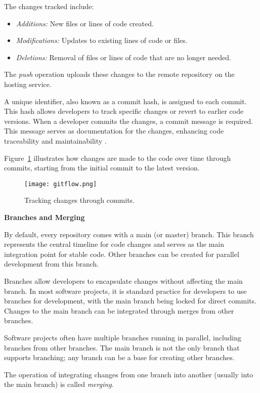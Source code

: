 The changes tracked include:

\begin{itemize}
\item \textit{Additions:} New files or lines of code created.
\item \textit{Modifications:} Updates to existing lines of code or files.
\item \textit{Deletions:} Removal of files or lines of code that are no longer needed.
\end{itemize}

The \textit{push} operation uploads these changes to the remote repository on the hosting service.

A unique identifier, also known as a commit hash, is assigned to each commit. This hash allows developers to track specific changes or revert to earlier code versions. When a developer commits the changes, a commit message is required. This message serves as documentation for the changes, enhancing code traceability and maintainability \cite{git}.

Figure~\ref{fig:gitflow} illustrates how changes are made to the code over time through commits, starting from the initial commit to the latest version.

\begin{figure}[h!]
\centering
\texttt{[image: gitflow.png]}
\caption{Tracking changes through commits.}
\label{fig:gitflow}
\end{figure}

\textbf{Branches and Merging}

By default, every repository comes with a main (or master) branch. This branch represents the central timeline for code changes and serves as the main integration point for stable code. Other branches can be created for parallel development from this branch.

Branches allow developers to encapsulate changes without affecting the main branch. In most software projects, it is standard practice for developers to use branches for development, with the main branch being locked for direct commits. Changes to the main branch can be integrated through merges from other branches.

Software projects often have multiple branches running in parallel, including branches from other branches. The main branch is not the only branch that supports branching; any branch can be a base for creating other branches.

The operation of integrating changes from one branch into another (usually into the main branch) is called \textit{merging}.

